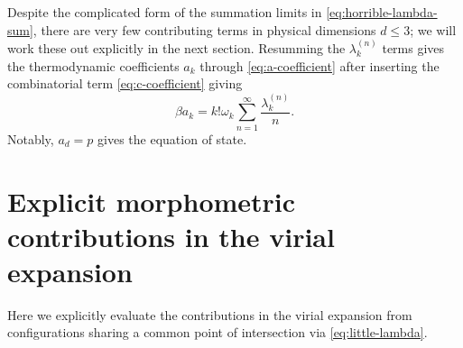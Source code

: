 \documentclass[11pt,twoside]{report}
\begin{document}
Despite the complicated form of the summation limits in \eqref{eq:horrible-lambda-sum}, there are very few contributing terms in physical dimensions $d \le 3$; we will work these out explicitly in the next section.
Resumming the $\lambda_k^{(n)}$ terms gives the thermodynamic coefficients $a_k$ through \eqref{eq:a-coefficient} after inserting the combinatorial term \eqref{eq:c-coefficient} giving
\begin{equation}\label{eq:final-a-coefficient}
  \beta a_k = k! \omega_k \sum_{n=1}^\infty \frac{\lambda_k^{(n)}}{n}.
\end{equation}
Notably, $a_d = p$ gives the equation of state.

\section{Explicit morphometric contributions in the virial expansion}
\label{sec:explicit-lambda}

Here we explicitly evaluate the contributions in the virial expansion from configurations sharing a common point of intersection via \eqref{eq:little-lambda}.
\end{document}
